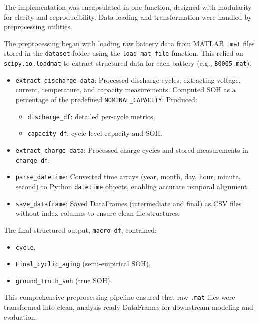The implementation was encapsulated in one function, designed with modularity for clarity and reproducibility. Data loading and transformation were handled by preprocessing utilities.

The preprocessing began with loading raw battery data from MATLAB \texttt{.mat} files stored in the \texttt{dataset} folder using the \texttt{load\_mat\_file} function. This relied on\\ \texttt{scipy.io.loadmat} to extract structured data for each battery (e.g., \texttt{B0005.mat}).

\begin{itemize}
    \item \texttt{extract\_discharge\_data}: Processed discharge cycles, extracting voltage, current, temperature, and capacity measurements. Computed SOH as a percentage of the predefined \texttt{NOMINAL\_CAPACITY}. Produced:
    \begin{itemize}
        \item \texttt{discharge\_df}: detailed per-cycle metrics,
        \item \texttt{capacity\_df}: cycle-level capacity and SOH.
    \end{itemize}

    \item \texttt{extract\_charge\_data}: Processed charge cycles and stored measurements in \\
    \texttt{charge\_df}.

    \item \texttt{parse\_datetime}: Converted time arrays (year, month, day, hour, minute, second) to Python \texttt{datetime} objects, enabling accurate temporal alignment.

    \item \texttt{save\_dataframe}: Saved DataFrames (intermediate and final) as CSV files without index columns to ensure clean file structures.
\end{itemize}

The final structured output, \texttt{macro\_df}, contained:
\begin{itemize}
    \item \texttt{cycle},
    \item \texttt{Final\_cyclic\_aging} (semi-empirical SOH),
    \item \texttt{ground\_truth\_soh} (true SOH).
\end{itemize}

This comprehensive preprocessing pipeline ensured that raw \texttt{.mat} files were transformed into clean, analysis-ready DataFrames for downstream modeling and evaluation.


